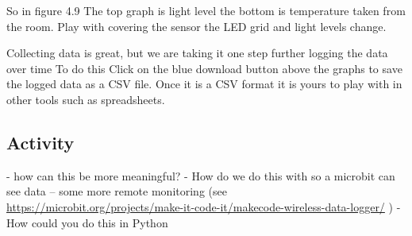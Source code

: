 So in figure 4.9 The top graph is light level the bottom is temperature taken from the room. Play with covering the sensor the LED grid and light levels change.

Collecting data is great, but we are taking it one step further logging the data over time To do this Click on the blue download button above the graphs to save the logged data as a CSV file. Once it is a CSV format it is yours to play with in other tools such as spreadsheets.


\subsection{Activity} 
-	how can this be more meaningful?
-	How do we do this with so a microbit can see data – some more remote monitoring (see \url{https://microbit.org/projects/make-it-code-it/makecode-wireless-data-logger/} )
-	How could you do this in Python

